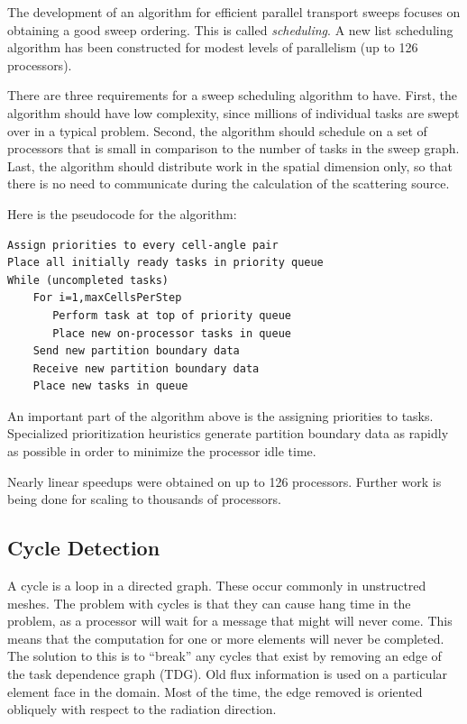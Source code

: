 \documentclass[11pt, letterpaper,titlepage,oneside]{article}
\begin{document}
The development of an algorithm for efficient parallel transport sweeps focuses on obtaining a good sweep ordering. This is called \textit{scheduling}. A new list scheduling algorithm has been constructed for modest levels of parallelism (up to 126 processors).

There are three requirements for a sweep scheduling algorithm to have. First, the algorithm should have low complexity, since millions of individual tasks are swept over in a typical problem. Second, the algorithm should schedule on a set of processors that is small in comparison to the number of tasks in the sweep graph. Last, the algorithm should distribute work in the spatial dimension only, so that there is no need to communicate during the calculation of the scattering source. 

Here is the pseudocode for the algorithm:

\begin{verbatim}
Assign priorities to every cell-angle pair
Place all initially ready tasks in priority queue
While (uncompleted tasks)
    For i=1,maxCellsPerStep
       Perform task at top of priority queue
       Place new on-processor tasks in queue
    Send new partition boundary data
    Receive new partition boundary data
    Place new tasks in queue 
\end{verbatim}

An important part of the algorithm above is the assigning priorities to tasks. Specialized prioritization heuristics generate partition boundary data as rapidly as possible in order to minimize the processor idle time. 

Nearly linear speedups were obtained on up to 126 processors. Further work is being done for scaling to thousands of processors. 

\subsection*{Cycle Detection}

A cycle is a loop in a directed graph. These occur commonly in unstructred meshes. The problem with cycles is that they can cause hang time in the problem, as a processor will wait for a message that might will never come. This means that the computation for one or more elements will never be completed. The solution to this is to ``break'' any cycles that exist by removing an edge of the task dependence graph (TDG). Old flux information is used on a particular element face in the domain. Most of the time, the edge removed is oriented obliquely with respect to the radiation direction. 
\end{document}
